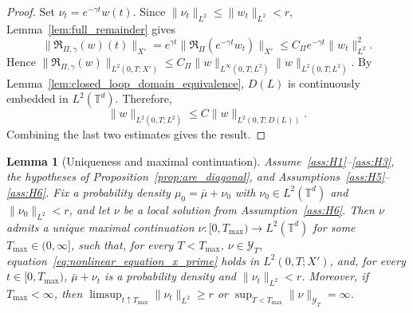 \documentclass[11pt]{article}
\numberwithin{equation}{section}
\newtheorem{lemma}[theorem]{Lemma}
\theoremstyle{definition}
\newcommand{\T}{\mathbb{T}}
\begin{document}
\begin{proof}
    Set $\nu_t = e^{-\gamma t}w(t)$. 
    Since $\|\nu_t\|_{L^2} \le \|w_t\|_{L^2} < r$, Lemma~\ref{lem:full_remainder} gives
    \[
    \|\mathfrak{R}_{\Pi,\gamma}(w)(t)\|_{X'} = e^{\gamma t}\|\mathfrak{R}_\Pi(e^{-\gamma t}w_t)\|_{X'} \le C_\Pi e^{-\gamma t}\|w_t\|_{L^2}^2.
    \]
    Hence $\|\mathfrak{R}_{\Pi,\gamma}(w)\|_{L^2(0,T; X')} \le C_\Pi\|w\|_{L^\infty(0,T;L^2)}\|w\|_{L^2(0,T;L^2)}$.
    By Lemma~\ref{lem:closed_loop_domain_equivalence}, $D(L)$ is continuously embedded in $L^2(\T^d)$. 
    Therefore,
    \[
    \|w\|_{L^2(0,T;L^2)} \le C\|w\|_{L^2(0,T;D(L))}.
    \]
    Combining the last two estimates gives the result.
\end{proof}

\begin{lemma}[Uniqueness and maximal continuation]
    \label{lem:maximal_continuation}
    Assume~\ref{ass:H1}--\ref{ass:H3}, the hypotheses of Proposition~\ref{prop:are_diagonal}, and Assumptions~\ref{ass:H5}--\ref{ass:H6}.
    Fix a probability density $\mu_0 = \bar\mu + \nu_0$ with $\nu_0 \in L^2(\T^d)$ and $\|\nu_0\|_{L^2} < r$, and let $\nu$ be a local solution from Assumption~\ref{ass:H6}.
    Then $\nu$ admits a unique maximal continuation $\nu \colon [0,T_{\max} )\longrightarrow L^2(\T^d)$ for some $ T_{\max} \in (0,\infty]$, such that, for every $T < T_{\max}$, $\nu \in \mathcal{Y}_T$, equation~\eqref{eq:nonlinear_equation_x_prime} holds in $L^2(0,T;X')$, and, for every $t \in [0,T_{\max})$, $\bar\mu + \nu_t$ is a probability density and $\|\nu_t\|_{L^2} < r$.
    Moreover, if $T_{\max} < \infty$, then $\limsup_{t\uparrow T_{\max}} \|\nu_t\|_{L^2} \ge r$ or $\sup_{T < T_{\max}} \|\nu\|_{\mathcal{Y}_T} = \infty$.
\end{lemma}
\end{document}

